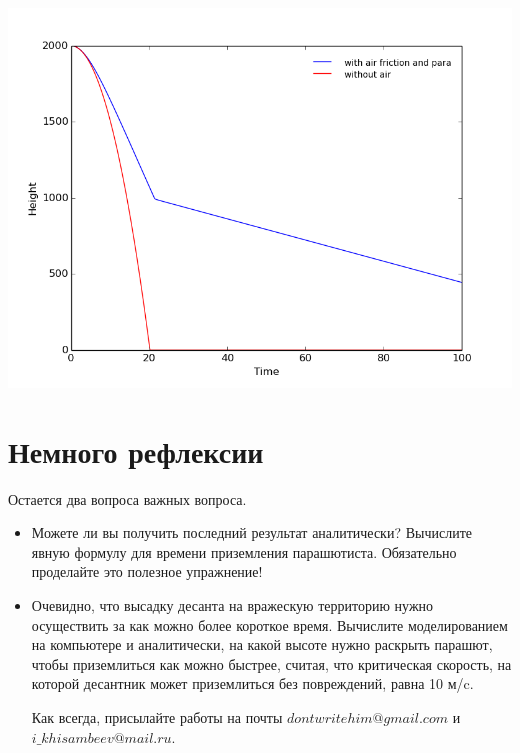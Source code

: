 \documentclass[a4paper,12pt]{article}
\begin{document}
\includegraphics[scale=0.7]{skydiving}
\section{Немного рефлексии }
Остается два вопроса важных вопроса.
\begin{itemize}
\item Можете ли вы получить последний результат аналитически? Вычислите явную формулу для времени приземления парашютиста. Обязательно проделайте это полезное упражнение!
\item Очевидно, что высадку десанта на вражескую территорию нужно осуществить за как можно более короткое время. Вычислите моделированием на компьютере и аналитически, на какой высоте нужно раскрыть парашют, чтобы приземлиться как можно быстрее, считая, что критическая скорость, на которой десантник может приземлиться без повреждений, равна 10 м/c.


Как всегда, присылайте работы на почты $dontwritehim@gmail.com$ и $i\_khisambeev@mail.ru$.
\end{itemize}
\end{document}
